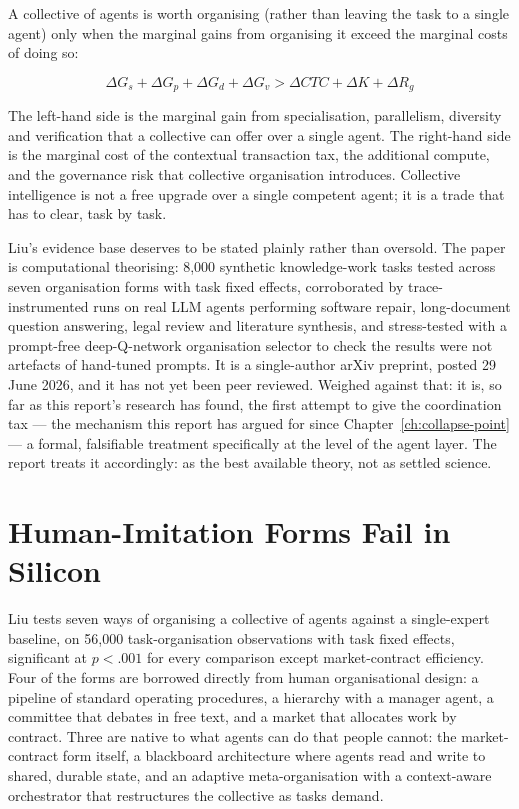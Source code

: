 A collective of agents is worth organising (rather than leaving the task to a single agent) only when the marginal gains from organising it exceed the marginal costs of doing so:

\[
\Delta G_s + \Delta G_p + \Delta G_d + \Delta G_v > \Delta CTC + \Delta K + \Delta R_g
\]

The left-hand side is the marginal gain from specialisation, parallelism, diversity and verification that a collective can offer over a single agent. The right-hand side is the marginal cost of the contextual transaction tax, the additional compute, and the governance risk that collective organisation introduces. Collective intelligence is not a free upgrade over a single competent agent; it is a trade that has to clear, task by task.

Liu's evidence base deserves to be stated plainly rather than oversold. The paper is computational theorising: 8,000 synthetic knowledge-work tasks tested across seven organisation forms with task fixed effects, corroborated by trace-instrumented runs on real LLM agents performing software repair, long-document question answering, legal review and literature synthesis, and stress-tested with a prompt-free deep-Q-network organisation selector to check the results were not artefacts of hand-tuned prompts. It is a single-author arXiv preprint, posted 29 June 2026, and it has not yet been peer reviewed. Weighed against that: it is, so far as this report's research has found, the first attempt to give the coordination tax --- the mechanism this report has argued for since Chapter~\ref{ch:collapse-point} --- a formal, falsifiable treatment specifically at the level of the agent layer. The report treats it accordingly: as the best available theory, not as settled science.

\section{Human-Imitation Forms Fail in Silicon}

Liu tests seven ways of organising a collective of agents against a single-expert baseline, on 56,000 task-organisation observations with task fixed effects, significant at $p < .001$ for every comparison except market-contract efficiency. Four of the forms are borrowed directly from human organisational design: a pipeline of standard operating procedures, a hierarchy with a manager agent, a committee that debates in free text, and a market that allocates work by contract. Three are native to what agents can do that people cannot: the market-contract form itself, a blackboard architecture where agents read and write to shared, durable state, and an adaptive meta-organisation with a context-aware orchestrator that restructures the collective as tasks demand.

